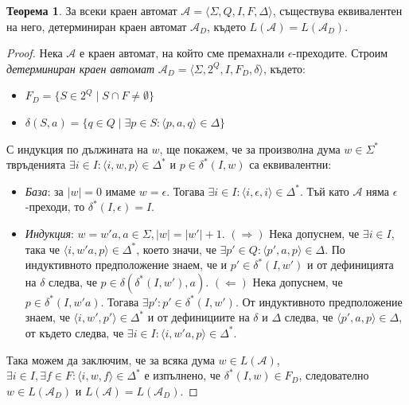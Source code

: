 \documentclass[12pt, oneside]{article}
\theoremstyle{definition}
\newtheorem{theorem}{Теорема}[section]
\begin{document}
\begin{theorem}
	За всеки краен автомат \(\mathcal{A} = \langle \Sigma, Q, I, F, \Delta \rangle \), съществува еквивалентен на него, детерминиран краен автомат \( \mathcal{A}_D \), където \( L(\mathcal{A}) = L(\mathcal{A}_D) \).
	\begin{proof}
		Нека \( \mathcal{A} \) е краен автомат, на който сме премахнали \( \epsilon \)-преходите. Строим \emph{детерминиран краен автомат} \( \mathcal{A}_D = \langle \Sigma, 2^Q, I, F_D, \delta \rangle \), където:
		\begin{itemize}
			\item \( F_D = \{ S \in 2^Q \mid S \cap F \neq \emptyset \} \)
			\item \( \delta(S,a) = \{ q \in Q \mid \exists p \in S : \langle p, a, q \rangle \in \Delta \} \)
		\end{itemize}
		С индукция по дължината на \( w \), ще покажем, че за произволна дума \( w \in \Sigma^* \) твръденията \( \exists i \in I: \langle i, w, p \rangle \in \Delta^* \) и \( p \in \delta^*(I, w)\) са еквивалентни:
		\begin{itemize}
			\item \emph{База}: за \( |w| = 0 \) имаме \( w = \epsilon \). Тогава \( \exists i \in I: \langle  i, \epsilon, i \rangle \in \Delta^* \). Тъй като \( \mathcal{A} \) няма \( \epsilon \)-преходи, то \( \delta^*(I, \epsilon) = I \).
			
			\item \emph{Индукция}: \( w = w'a, a \in \Sigma, |w| = |w'| + 1 \). \newline
			\( (\Rightarrow) \) Нека допуснем, че \( \exists i \in I \), така че \( \langle i, w'a, p \rangle \in \Delta^* \), което значи, че \( \exists p' \in Q: \langle p', a, p \rangle \in \Delta \). По индуктивното предположение знаем, че и \( p' \in \delta^*(I, w') \) и от дефиницията на \( \delta \) следва, че \( p \in \delta(\delta^*(I, w'), a) \). \newline
			\( (\Leftarrow) \) Нека допуснем, че \( p \in \delta^*(I, w'a) \). Тогава \( \exists p': p' \in \delta^*(I, w') \). От индуктивното предположение знаем, че \( \langle i, w', p' \rangle \in \Delta^* \) и от дефинициите на \( \delta  \) и \( \Delta \) следва, че \( \langle p', a, p \rangle \in \Delta \), от където следва, че \( \exists i \in I: \langle i, w'a, p \rangle \in \Delta^* \).
		\end{itemize}
		Така можем да заключим, че за всяка дума \( w \in L(\mathcal{A}) \), \( \exists i \in I, \exists f \in F : \langle i, w, f \rangle \in \Delta^* \) е изпълнено, че \( \delta^*(I, w) \in F_D \), следователно \( w \in L(\mathcal{A}_D) \) и \( L(\mathcal{A}) = L(\mathcal{A}_D) \).
	\end{proof}
\end{theorem}
\end{document}
